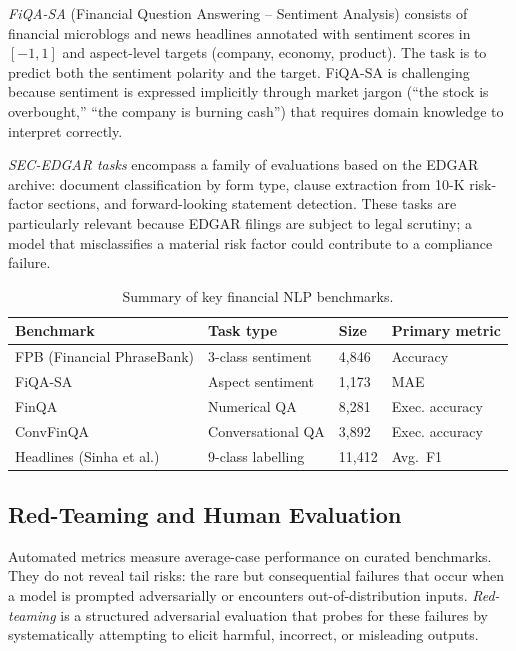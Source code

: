 \begin{context}
\emph{FiQA-SA} \cite{maia2018fiqa} (Financial Question Answering -- Sentiment
Analysis) consists of financial microblogs and news headlines annotated with
sentiment scores in $[-1, 1]$ and aspect-level targets (company, economy,
product).  The task is to predict both the sentiment polarity and the target.
FiQA-SA is challenging because sentiment is expressed implicitly through market
jargon (``the stock is overbought,'' ``the company is burning cash'') that
requires domain knowledge to interpret correctly.

\emph{SEC-EDGAR tasks} encompass a family of evaluations based on the EDGAR
archive: document classification by form type, clause extraction from 10-K
risk-factor sections, and forward-looking statement detection.  These tasks
are particularly relevant because EDGAR filings are subject to legal scrutiny;
a model that misclassifies a material risk factor could contribute to a
compliance failure.

\begin{table}[H]
  \centering
  \caption{Summary of key financial NLP benchmarks.}
  \label{tab:financial-benchmarks}
  \begin{tabular}{llll}
    \toprule
    Benchmark & Task type & Size & Primary metric \\
    \midrule
    FPB (Financial PhraseBank) & 3-class sentiment & 4,846 & Accuracy \\
    FiQA-SA                    & Aspect sentiment  & 1,173 & MAE \\
    FinQA                      & Numerical QA      & 8,281 & Exec. accuracy \\
    ConvFinQA                  & Conversational QA & 3,892 & Exec. accuracy \\
    Headlines (Sinha et al.)   & 9-class labelling & 11,412 & Avg.\ F1 \\
    \bottomrule
  \end{tabular}
\end{table}

\subsection{Red-Teaming and Human Evaluation}
\label{subsec:red-teaming}

Automated metrics measure average-case performance on curated benchmarks.
They do not reveal tail risks: the rare but consequential failures that occur
when a model is prompted adversarially or encounters out-of-distribution inputs.
\emph{Red-teaming} is a structured adversarial evaluation that probes for these
failures by systematically attempting to elicit harmful, incorrect, or
misleading outputs.


\end{context}
